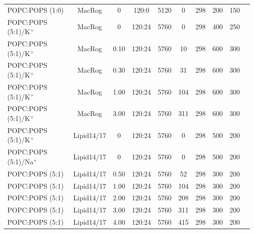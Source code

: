 \documentclass[aps,prl,superscriptaddress,twocolumn]{revtex4}
\begin{document}
\begin{table}[tb]
\begin{tabular}{l c c c c c c c c c }
  \hline
    POPC:POPS (1:0)        & MacRog \cite{maciejewski14} &0    & 120:0  & 5120 & 0    & 298  & 200 & 150 & \cite{macrogPOPC298K}  \\
    POPC:POPS (5:1)/K$^+$  & MacRog \cite{maciejewski14} &0    & 120:24 & 5760 & 0    & 298  & 400 & 250 & \cite{POPCpopsMACROG}  \\
    POPC:POPS (5:1)/K$^+$  & MacRog \cite{maciejewski14} & 0.10 & 120:24 & 5760 & 10   & 298  & 600 & 300 & \cite{POPCpopsMACROG}  \\
    POPC:POPS (5:1)/K$^+$  & MacRog \cite{maciejewski14} & 0.30 & 120:24 & 5760 & 31   & 298  & 600 & 300  & \cite{POPCpopsMACROG}  \\
    POPC:POPS (5:1)/K$^+$  & MacRog \cite{maciejewski14} & 1.00   & 120:24 & 5760 & 104  & 298  & 600 & 300  & \cite{POPCpopsMACROG}  \\
    POPC:POPS (5:1)/K$^+$  & MacRog \cite{maciejewski14} & 3.00   & 120:24 & 5760 & 311  & 298  & 600 & 300  & \cite{POPCpopsMACROG}  \\
    \hline
    POPC:POPS (5:1)/K$^+$  & Lipid14/17 \cite{dickson14,gould18}  & 0      & 120:24 & 5760 & 0   & 298  & 500 & 200 & \cite{POPCpopsLIPID17withKCI}  \\
    POPC:POPS (5:1)/Na$^+$  & Lipid14/17 \cite{dickson14,gould18} & 0      & 120:24 & 5760 & 0   & 298  & 500 & 200 & \cite{POPCpopsLIPID17withNaCI}  \\
    POPC:POPS (5:1)         & Lipid14/17 \cite{dickson14,gould18} &0.50    & 120:24 & 5760 & 52   & 298  & 300 & 200 & \cite{POPCpopsLIPID17withCaCl}  \\
    POPC:POPS (5:1)  & Lipid14/17 \cite{dickson14,gould18}        &1.00    & 120:24 & 5760 & 104   & 298  & 300 & 200 & \cite{POPCpopsLIPID17withCaCl}  \\
    POPC:POPS (5:1)  & Lipid14/17 \cite{dickson14,gould18}        &2.00    & 120:24 & 5760 & 208   & 298  & 300 & 200 & \cite{POPCpopsLIPID17withCaCl}  \\
    POPC:POPS (5:1)  & Lipid14/17 \cite{dickson14,gould18}        &3.00    & 120:24 & 5760 & 311   & 298  & 300 & 200 & \cite{POPCpopsLIPID17withCaCl}  \\
    POPC:POPS (5:1)  & Lipid14/17 \cite{dickson14,gould18}        &4.00    & 120:24 & 5760 & 415   & 298  & 300 & 200 & \cite{POPCpopsLIPID17withCaCl}  \\

\end{tabular}
\end{table}
\end{document}
